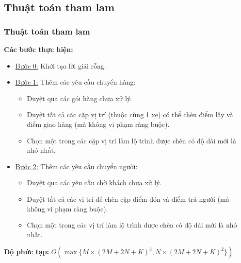 \documentclass{beamer}
\begin{document}
	\subsection{Thuật toán tham lam}
	\begin{frame}
		\frametitle{Thuật toán tham lam}
		\textbf{Các bước thực hiện:}
		\begin{itemize}
			\item \underline{Bước 0:} Khởi tạo lời giải rỗng.
			\item {
				\underline{Bước 1:} Thêm các yêu cầu chuyển hàng:
				\begin{itemize}
					\item Duyệt qua các gói hàng chưa xử lý.
					\item Duyệt tất cả các cặp vị trí (thuộc cùng 1 xe) có thể chèn điểm lấy và điểm giao hàng (mà không vi phạm ràng buộc).
					\item Chọn một trong các cặp vị trí làm lộ trình được chèn có độ dài mới là nhỏ nhất.
				\end{itemize}
			}
			\item {
				\underline{Bước 2:} Thêm các yêu cầu chuyển người:
				\begin{itemize}
					\item Duyệt qua các yêu cầu chờ khách chưa xử lý.
					\item Duyệt tất cả các vị trí để chèn cặp điểm đón và điểm trả người (mà không vi phạm ràng buộc).
					\item Chọn một trong các vị trí làm lộ trình được chèn có độ dài mới là nhỏ nhất.
				\end{itemize}
			}
		\end{itemize}
		\textbf{Độ phức tạp:} $O(\max \{ M\times (2M+2N+K)^3, N\times (2M+2N+K)^2 \})$
	\end{frame}
	
	
\end{document}
